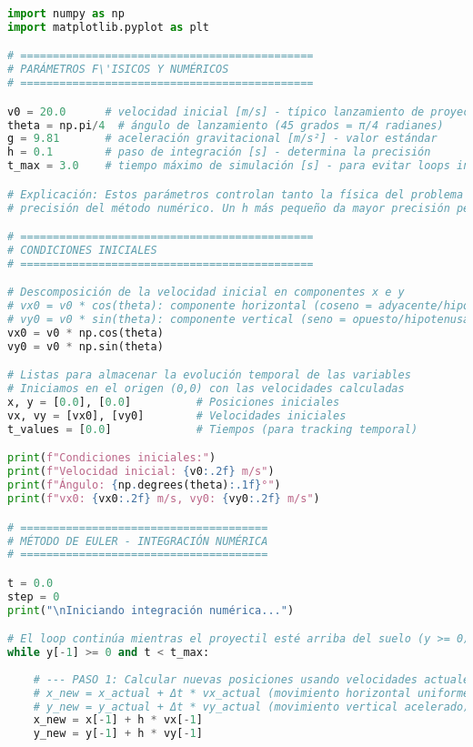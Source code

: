 \documentclass[12pt,a4paper]{article}
\begin{document}
\begin{lstlisting}[language=Python, basicstyle=\small\ttfamily]
import numpy as np
import matplotlib.pyplot as plt

# =============================================
# PARÁMETROS F\'ISICOS Y NUMÉRICOS
# =============================================

v0 = 20.0      # velocidad inicial [m/s] - típico lanzamiento de proyectil
theta = np.pi/4  # ángulo de lanzamiento (45 grados = π/4 radianes)
g = 9.81       # aceleración gravitacional [m/s²] - valor estándar
h = 0.1        # paso de integración [s] - determina la precisión
t_max = 3.0    # tiempo máximo de simulación [s] - para evitar loops infinitos

# Explicación: Estos parámetros controlan tanto la física del problema como la
# precisión del método numérico. Un h más pequeño da mayor precisión pero mayor costo computacional.

# =============================================
# CONDICIONES INICIALES
# =============================================

# Descomposición de la velocidad inicial en componentes x e y
# vx0 = v0 * cos(theta): componente horizontal (coseno = adyacente/hipotenusa)
# vy0 = v0 * sin(theta): componente vertical (seno = opuesto/hipotenusa)
vx0 = v0 * np.cos(theta)
vy0 = v0 * np.sin(theta)

# Listas para almacenar la evolución temporal de las variables
# Iniciamos en el origen (0,0) con las velocidades calculadas
x, y = [0.0], [0.0]          # Posiciones iniciales
vx, vy = [vx0], [vy0]        # Velocidades iniciales
t_values = [0.0]             # Tiempos (para tracking temporal)

print(f"Condiciones iniciales:")
print(f"Velocidad inicial: {v0:.2f} m/s")
print(f"Ángulo: {np.degrees(theta):.1f}°")
print(f"vx0: {vx0:.2f} m/s, vy0: {vy0:.2f} m/s")

# ======================================
# MÉTODO DE EULER - INTEGRACIÓN NUMÉRICA
# ======================================

t = 0.0
step = 0
print("\nIniciando integración numérica...")

# El loop continúa mientras el proyectil esté arriba del suelo (y >= 0)
while y[-1] >= 0 and t < t_max:
    
    # --- PASO 1: Calcular nuevas posiciones usando velocidades actuales ---
    # x_new = x_actual + Δt * vx_actual (movimiento horizontal uniforme)
    # y_new = y_actual + Δt * vy_actual (movimiento vertical acelerado)
    x_new = x[-1] + h * vx[-1]
    y_new = y[-1] + h * vy[-1]
    

\end{lstlisting}
\end{document}

